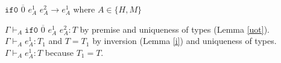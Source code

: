 \begin{case}
$\mathtt{if0}$ $\overline{0}$ $e_{A}^{1}$ $e_{A}^{2}\rightarrow e_{A}^{1}$ where $A\in\lbrace H,M\rbrace$

$\Gamma\vdash_{A}\mathtt{if0}$ $\overline{0}$ $e_{A}^{1}$ $e_{A}^{2}:T$ by premise and uniqueness of types (Lemma \ref{uot}).  $\Gamma\vdash_{A}e_{A}^{1}:T_{1}$ and $T=T_{1}$ by inversion (Lemma \ref{i}) and uniqueness of types.  $\Gamma\vdash_{A}e_{A}^{1}:T$ because $T_{1}=T$.
\end{case}